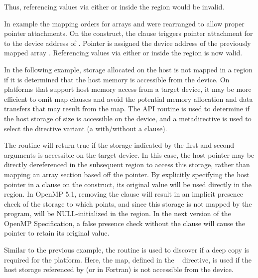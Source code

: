 Thus, referencing values via either  or  inside
the  region would be invalid.


In example  the mapping orders for arrays 
and  were rearranged to allow proper pointer attachments.
On the  construct, the  clause triggers pointer
attachment for  to the device address of . 
Pointer  is assigned the device address of the previously mapped
 array .
Referencing values via either  or  inside the  region is now valid.

\clearpage

In the following example, storage allocated on the host is not mapped in a 
region if it is determined that the host memory is accessible from the device.
On platforms that support host memory access from a target device, 
it may be more efficient to omit map clauses and avoid the potential memory allocation 
and data transfers that may result from the map.
The  API routine is used to determine if the 
host storage of size  is accessible on the device, and a metadirective
is used to select the directive variant (a  with/without a  clause).

The  routine will return true if the storage indicated 
by the first and second arguments is accessible on the target device. In this case, 
the host pointer  may be directly dereferenced in the subsequent 
 region to access this storage, rather than mapping an array section based 
off the pointer. By explicitly specifying the host pointer in a  
clause on the construct, its original value will be used directly in the  region. 
In OpenMP 5.1, removing the  clause will result in an implicit presence 
check of the storage to which  points, and since this storage is not mapped by the 
program,  will be NULL-initialized in the  region. 
In the next version of the OpenMP Specification, a false presence check without 
the  clause will cause the pointer to retain its original value. 


Similar to the previous example, the  routine is used to
discover if a deep copy is required for the platform.  Here, the  map,
defined in the ~ directive, is used if the host storage referenced by 
 (or  in Fortran) is not accessible from the device.

